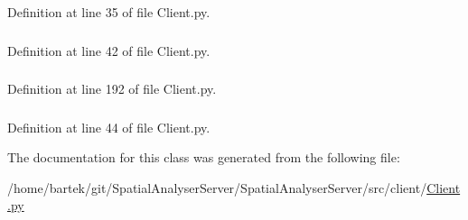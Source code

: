 Definition at line 35 of file Client.py.

\hypertarget{classsrc_1_1client_1_1Client_1_1Client_a0f0a7482f5da3dad9608fc6f2627a9b5}{
\subsubsection[{obj}]{}}
\label{classsrc_1_1client_1_1Client_1_1Client_a0f0a7482f5da3dad9608fc6f2627a9b5}


Definition at line 42 of file Client.py.

\hypertarget{classsrc_1_1client_1_1Client_1_1Client_a0d51a95d2a48b4812b6bc43429c36acc}{
\subsubsection[{outList}]{}}
\label{classsrc_1_1client_1_1Client_1_1Client_a0d51a95d2a48b4812b6bc43429c36acc}


Definition at line 192 of file Client.py.

\hypertarget{classsrc_1_1client_1_1Client_1_1Client_a29aa6a88fd5d71d515ec6b8b36a909a5}{
\subsubsection[{rootContext}]{}}
\label{classsrc_1_1client_1_1Client_1_1Client_a29aa6a88fd5d71d515ec6b8b36a909a5}


Definition at line 44 of file Client.py.



The documentation for this class was generated from the following file:\begin{DoxyCompactItemize}
\item 
/home/bartek/git/SpatialAnalyserServer/SpatialAnalyserServer/src/client/\hyperlink{Client_8py}{Client.py}\end{DoxyCompactItemize}
